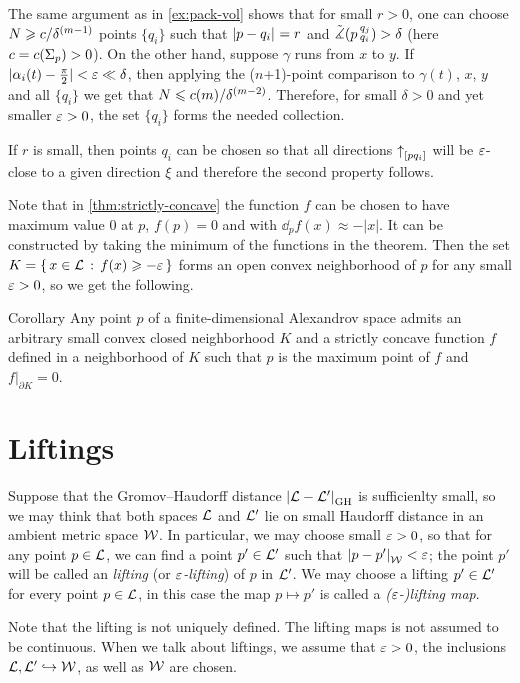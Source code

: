 The same argument as in \ref{ex:pack-vol} shows that for small $r>0$, one can
choose $N\geqslant c/\delta^{(m-1)}$ points $\{q_i\}$ such that $\dist{p}{q_i}{}=r$
and $\tilde\measuredangle(p\,{}^{q_j}_{q_i})>\delta$ (here $c=c(\Sigma_p)>0$).
On the other hand, suppose $\gamma$ runs from $x$ to $y$.
If $|\alpha_i(t)- \tfrac\pi2|<\varepsilon\ll\delta$, then applying the ($n$+1)-point comparison to $\gamma(t)$, $x$, $y$ and all $\{q_i\}$ we get that
$N\leqslant c(m)/\delta^{(m-2)}$. 
Therefore, for small $\delta>0$ and yet smaller $\varepsilon>0$, the set $\{q_i\}$ forms the needed collection.

If $r$ is small, then points $q_i$ can be chosen so that all directions
${\uparrow}_{[{p}{q_i}]}$ will be $\varepsilon$-close to a given direction $\xi$ and
therefore the second property follows.
\qeds

Note that in \ref{thm:strictly-concave} the function $f$ can be chosen to have maximum value $0$ at $p$,
$f(p)=0$ and with $\dd_p f(x)\approx-|x|$.
It can be constructed by taking the minimum of the functions in the theorem.
Then the set $K=\left\{\,{x\in\mathcal{L}}\,:\,{f(x)\geqslant -\varepsilon}\,\right\}$ forms an open convex neighborhood of $p$ for any small $\varepsilon>0$, so we get the following.


\begin{thm}{Corollary}\label{cor:convex-nbhd}
Any point $p$ of a finite-dimensional Alexandrov space admits an arbitrary small convex closed neighborhood $K$ and a strictly concave function $f$ defined in a neighborhood of $K$ such that $p$ is the maximum point of $f$
and $f|_{\partial K}=0$.
\end{thm}

\section{Liftings}

Suppose that the Gromov--Haudorff distance $\dist{\spc{L}}{\spc{L}'}{\GH}$ is sufficienlty small, so we may think that both spaces $\mathcal{L}$ and $\mathcal{L}'$ lie on small Haudorff distance in an ambient metric space $\mathcal{W}$.
In particular, we may choose small $\varepsilon>0$, so that for any point $p\in \mathcal{L}$, we can find a point $p'\in \mathcal{L}'$ such that $\dist{p}{p'}{\spc{W}}<\eps$;
the point $p'$ will be called an \emph{lifting} (or \emph{$\varepsilon$-lifting}) of $p$ in $\mathcal{L}'$.
We may choose a lifting $p'\in\mathcal{L}'$ for every point $p\in\mathcal{L}$, 
in this case the map $p\mapsto p'$ is called a {}\emph{($\varepsilon$-)lifting map}.

Note that the lifting is not uniquely defined.
The lifting maps is not assumed to be continuous.
When we talk about liftings, we assume that $\varepsilon>0$, the inclusions $\mathcal{L},\mathcal{L}'\hookrightarrow\mathcal{W}$,
as well as $\mathcal{W}$ are chosen.


